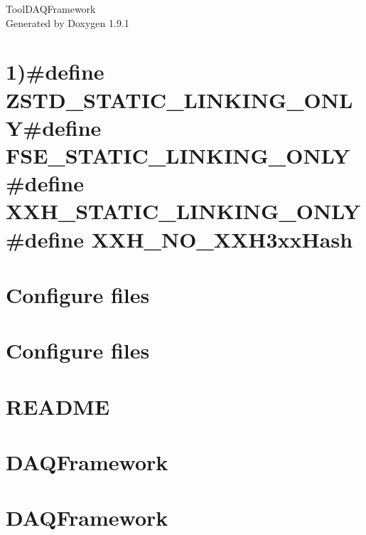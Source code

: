 \let\mypdfximage\pdfximage\def\pdfximage{\immediate\mypdfximage}\documentclass[twoside]{book}
\newcommand{\+}{\discretionary{\mbox{\scriptsize$\hookleftarrow$}}{}{}}
\newcommand{\clearemptydoublepage}{%
  \newpage{\pagestyle{empty}\cleardoublepage}%
}
\begin{document}
\raggedbottom

\hypersetup{pageanchor=false,
             bookmarksnumbered=true,
             pdfencoding=unicode
            }
\begin{titlepage}
\vspace*{7cm}
\begin{center}%
{\Large Tool\+DAQFramework }\\
\vspace*{1cm}
{\large Generated by Doxygen 1.9.1}\\
\end{center}
\end{titlepage}
\clearemptydoublepage
{}
\tableofcontents
\clearemptydoublepage
{}
\hypersetup{pageanchor=true}

\chapter{1)\#define ZSTD\+\_\+\+STATIC\+\_\+\+LINKING\+\_\+\+ONLY\#define FSE\+\_\+\+STATIC\+\_\+\+LINKING\+\_\+\+ONLY\#define XXH\+\_\+\+STATIC\+\_\+\+LINKING\+\_\+\+ONLY\#define XXH\+\_\+\+NO\+\_\+\+XXH3xx\+Hash}
\label{index}\hypertarget{index}{}
\chapter{Configure files}
\label{md_configfiles_README}

\chapter{Configure files}
\label{md_configfiles_template_README}

\chapter{README}
\label{md_DataModel_README}

\chapter{DAQFramework}
\label{md_include_README}

\chapter{DAQFramework}
\label{md_lib_README}

\end{document}
